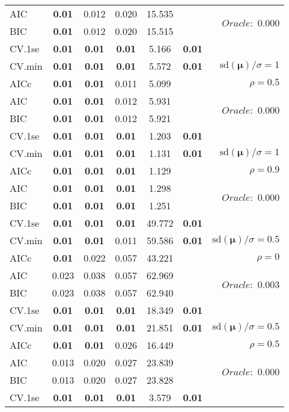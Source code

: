 \begin{table}
\begin{center}
\begin{tabular}{l*{5}{c}|r}
AIC & {\bf 0.01} & 0.012 & 0.020 & 15.535 & &  \multirow{2}{*}{$Oracle: $ 0.000} \\
BIC & {\bf 0.01} & 0.012 & 0.020 & 15.515 & &  \\
 \hline 
CV.1se & {\bf 0.01} & {\bf 0.01} & {\bf 0.01} & 5.166 & {\bf 0.01} & \\
CV.min & {\bf 0.01} & {\bf 0.01} & {\bf 0.01} & 5.572 & {\bf 0.01} &  $\mathrm{sd}(\mathbf{\mu})/\sigma=1$ \\
AICc & {\bf 0.01} & {\bf 0.01} & 0.011 & 5.099 & & $\rho=0.5$ \\
AIC & {\bf 0.01} & {\bf 0.01} & 0.012 & 5.931 & &  \multirow{2}{*}{$Oracle: $ 0.000} \\
BIC & {\bf 0.01} & {\bf 0.01} & 0.012 & 5.921 & &  \\
 \hline 
CV.1se & {\bf 0.01} & {\bf 0.01} & {\bf 0.01} & 1.203 & {\bf 0.01} & \\
CV.min & {\bf 0.01} & {\bf 0.01} & {\bf 0.01} & 1.131 & {\bf 0.01} &  $\mathrm{sd}(\mathbf{\mu})/\sigma=1$ \\
AICc & {\bf 0.01} & {\bf 0.01} & {\bf 0.01} & 1.129 & & $\rho=0.9$ \\
AIC & {\bf 0.01} & {\bf 0.01} & {\bf 0.01} & 1.298 & &  \multirow{2}{*}{$Oracle: $ 0.000} \\
BIC & {\bf 0.01} & {\bf 0.01} & {\bf 0.01} & 1.251 & &  \\
 \hline 
CV.1se & {\bf 0.01} & {\bf 0.01} & {\bf 0.01} & 49.772 & {\bf 0.01} & \\
CV.min & {\bf 0.01} & {\bf 0.01} & 0.011 & 59.586 & {\bf 0.01} &  $\mathrm{sd}(\mathbf{\mu})/\sigma=0.5$ \\
AICc & {\bf 0.01} & 0.022 & 0.057 & 43.221 & & $\rho=0$ \\
AIC & 0.023 & 0.038 & 0.057 & 62.969 & &  \multirow{2}{*}{$Oracle: $ 0.003} \\
BIC & 0.023 & 0.038 & 0.057 & 62.940 & &  \\
 \hline 
CV.1se & {\bf 0.01} & {\bf 0.01} & {\bf 0.01} & 18.349 & {\bf 0.01} & \\
CV.min & {\bf 0.01} & {\bf 0.01} & {\bf 0.01} & 21.851 & {\bf 0.01} &  $\mathrm{sd}(\mathbf{\mu})/\sigma=0.5$ \\
AICc & {\bf 0.01} & {\bf 0.01} & 0.026 & 16.449 & & $\rho=0.5$ \\
AIC & 0.013 & 0.020 & 0.027 & 23.839 & &  \multirow{2}{*}{$Oracle: $ 0.000} \\
BIC & 0.013 & 0.020 & 0.027 & 23.828 & &  \\
 \hline 
CV.1se & {\bf 0.01} & {\bf 0.01} & {\bf 0.01} & 3.579 & {\bf 0.01} & \\

\end{tabular}
\end{center}
\end{table}
